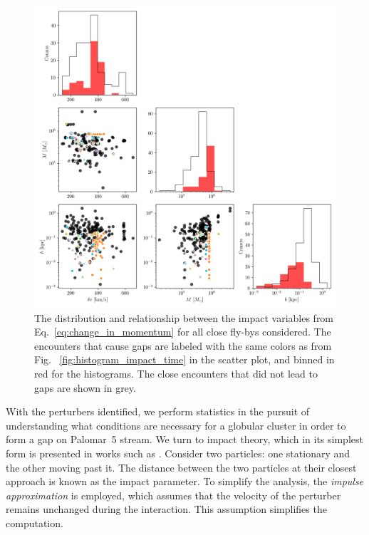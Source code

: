 \documentclass[draft]{aa}
\begin{document}
    \begin{figure}
      \centering
      \includegraphics[width=\linewidth]{impact_geometry_statistics.png}
      \caption{The distribution and relationship between the impact variables from Eq.~\ref{eq:change_in_momentum} for all close fly-bys considered. The encounters that cause gaps are labeled with the same colors as from Fig.~
      \ref{fig:histogram_impact_time} in the scatter plot, and binned in red for the histograms. The close encounters that did not lead to gaps are shown in grey. }
      \label{fig:impact_geometry_statistics}    
    \end{figure}



    With the perturbers identified, we perform statistics in the pursuit of understanding what conditions are necessary for a globular cluster in order to form a gap on Palomar~5 stream. We turn to impact theory, which in its simplest form is presented in works such as \citet{2008gady.book.....B}. Consider two particles: one stationary and the other moving past it. The distance between the two particles at their closest approach is known as the impact parameter. To simplify the analysis, the \textit{impulse approximation} is employed, which assumes that the velocity of the perturber remains unchanged during the interaction. This assumption simplifies the computation.
\end{document}
